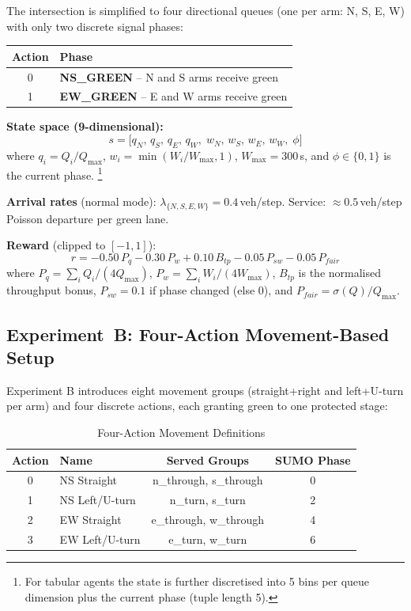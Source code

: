 \documentclass[conference]{IEEEtran}
\begin{document}
The intersection is simplified to four directional queues (one per
arm: N, S, E, W) with only two discrete signal phases:

\begin{center}
\begin{tabular}{cl}
\toprule
Action & Phase \\
\midrule
0 & \textbf{NS\_GREEN} -- N and S arms receive green \\
1 & \textbf{EW\_GREEN} -- E and W arms receive green \\
\bottomrule
\end{tabular}
\end{center}

\noindent\textbf{State space (9-dimensional):}
\begin{equation}
  s = \bigl[q_N,\,q_S,\,q_E,\,q_W,\;
              w_N,\,w_S,\,w_E,\,w_W,\;
              \phi\bigr]
\end{equation}
where $q_i = Q_i/Q_{\max}$, $w_i = \min(W_i/W_{\max}, 1)$,
$W_{\max}=300$\,s, and $\phi\in\{0,1\}$ is the current phase.%
\footnote{For tabular agents the state is further discretised into
5 bins per queue dimension plus the current phase (tuple length 5).}

\noindent\textbf{Arrival rates} (normal mode):
$\lambda_{\{N,S,E,W\}} = 0.4$\,veh/step.
Service: $\approx 0.5$\,veh/step Poisson departure per green lane.

\noindent\textbf{Reward} (clipped to $[-1,1]$):
\begin{equation}
  r = -0.50\,P_q -0.30\,P_w +0.10\,B_{tp}
      -0.05\,P_{sw} -0.05\,P_{fair}
\end{equation}
where $P_q{=}\sum_i Q_i/(4Q_{\max})$,
$P_w{=}\sum_i W_i/(4W_{\max})$,
$B_{tp}$ is the normalised throughput bonus,
$P_{sw}{=}0.1$ if phase changed (else 0), and
$P_{fair}{=}\sigma(Q)/Q_{\max}$.

\subsection{Experiment~B: Four-Action Movement-Based Setup}

Experiment B introduces eight movement groups (straight+right and
left+U-turn per arm) and four discrete actions, each granting green
to one protected stage:

\begin{table}[h]
\centering
\caption{Four-Action Movement Definitions}
\label{tab:actions}
\begin{tabular}{clcc}
\toprule
Action & Name & Served Groups & SUMO Phase \\
\midrule
0 & NS Straight    & n\_through, s\_through & 0 \\
1 & NS Left/U-turn & n\_turn, s\_turn       & 2 \\
2 & EW Straight    & e\_through, w\_through & 4 \\
3 & EW Left/U-turn & e\_turn, w\_turn       & 6 \\
\bottomrule
\end{tabular}
\end{table}
\end{document}
